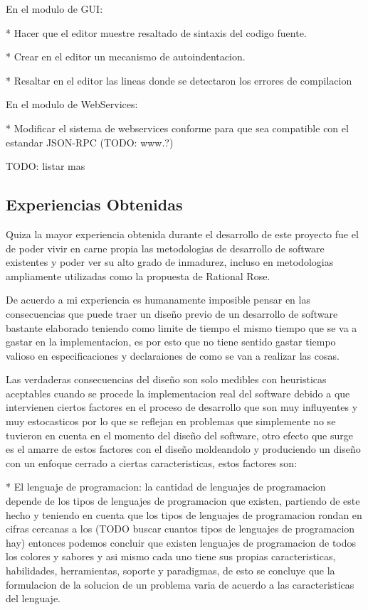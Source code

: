 En el modulo de GUI:

* Hacer que el editor muestre resaltado de sintaxis del codigo fuente.

* Crear en el editor un mecanismo de autoindentacion.

* Resaltar en el editor las lineas donde se detectaron los errores de compilacion


En el modulo de WebServices:

* Modificar el sistema de webservices conforme para que sea compatible con el estandar JSON-RPC (TODO: www.?)

TODO: listar mas

\subsection{Experiencias Obtenidas}


Quiza la mayor experiencia obtenida durante el desarrollo de este proyecto fue el de poder vivir en carne propia las metodologias de desarrollo de software existentes y poder ver su alto grado de inmadurez, incluso en metodologias ampliamente utilizadas como la propuesta de Rational Rose.

De acuerdo a mi experiencia es humanamente imposible pensar en las consecuencias que puede traer un diseño previo de un desarrollo de software bastante elaborado teniendo como limite de tiempo el mismo tiempo que se va a gastar en la implementacion, es por esto que no tiene sentido gastar tiempo valioso en especificaciones y declaraiones de como se van a realizar las cosas.

Las verdaderas consecuencias del diseño son solo medibles con heuristicas aceptables cuando se procede la implementacion real del software debido a que intervienen ciertos factores en el proceso de desarrollo que son muy influyentes y muy estocasticos por lo que se reflejan en problemas que simplemente no se tuvieron en cuenta en el momento del diseño del software, otro efecto que surge es el amarre de estos factores con el diseño moldeandolo y produciendo un diseño con un enfoque cerrado a ciertas caracteristicas, estos factores son:

* El lenguaje de programacion: la cantidad de lenguajes de programacion depende de los tipos de lenguajes de programacion que existen, partiendo de este hecho y teniendo en cuenta que los tipos de lenguajes de programacion rondan en cifras cercanas a los (TODO buscar cuantos tipos de lenguajes de programacion hay) entonces podemos concluir que existen lenguajes de programacion de todos los colores y sabores y asi mismo cada uno tiene sus propias caracteristicas, habilidades, herramientas, soporte y paradigmas, de esto se concluye que la formulacion de la solucion de un problema varia de acuerdo a las caracteristicas del lenguaje.

